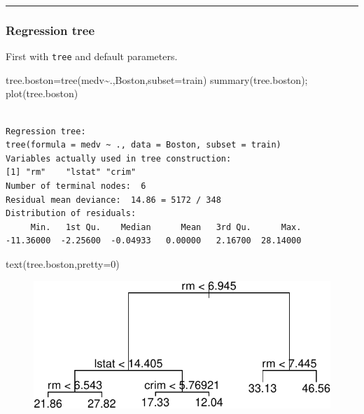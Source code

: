 \documentclass[
  letterpaper,
  DIV=11,
  numbers=noendperiod]{scrartcl}
\newenvironment{Shaded}{\begin{snugshade}}{\end{snugshade}}
\newcommand{\AttributeTok}[1]{\textcolor[rgb]{0.40,0.45,0.13}{#1}}
\newcommand{\DecValTok}[1]{\textcolor[rgb]{0.68,0.00,0.00}{#1}}
\newcommand{\FunctionTok}[1]{\textcolor[rgb]{0.28,0.35,0.67}{#1}}
\newcommand{\NormalTok}[1]{\textcolor[rgb]{0.00,0.23,0.31}{#1}}
\newcommand{\OtherTok}[1]{\textcolor[rgb]{0.00,0.23,0.31}{#1}}
\newcommand{\SpecialCharTok}[1]{\textcolor[rgb]{0.37,0.37,0.37}{#1}}
\begin{document}
\begin{center}\rule{0.5\linewidth}{0.5pt}\end{center}

\hypertarget{regression-tree-1}{%
\subsubsection{Regression tree}\label{regression-tree-1}}

First with \texttt{tree} and default parameters.

\begin{Shaded}
\begin{Highlighting}[]
\NormalTok{tree.boston}\OtherTok{=}\FunctionTok{tree}\NormalTok{(medv}\SpecialCharTok{\textasciitilde{}}\NormalTok{.,Boston,}\AttributeTok{subset=}\NormalTok{train)}
\FunctionTok{summary}\NormalTok{(tree.boston); }\FunctionTok{plot}\NormalTok{(tree.boston)}
\end{Highlighting}
\end{Shaded}

\begin{verbatim}

Regression tree:
tree(formula = medv ~ ., data = Boston, subset = train)
Variables actually used in tree construction:
[1] "rm"    "lstat" "crim" 
Number of terminal nodes:  6 
Residual mean deviance:  14.86 = 5172 / 348 
Distribution of residuals:
     Min.   1st Qu.    Median      Mean   3rd Qu.      Max. 
-11.36000  -2.25600  -0.04933   0.00000   2.16700  28.14000 
\end{verbatim}

\begin{Shaded}
\begin{Highlighting}[]
\FunctionTok{text}\NormalTok{(tree.boston,}\AttributeTok{pretty=}\DecValTok{0}\NormalTok{)}
\end{Highlighting}
\end{Shaded}

\begin{figure}[H]

{\centering \includegraphics{L13_files/figure-pdf/unnamed-chunk-6-1.pdf}

}

\end{figure}
\end{document}
